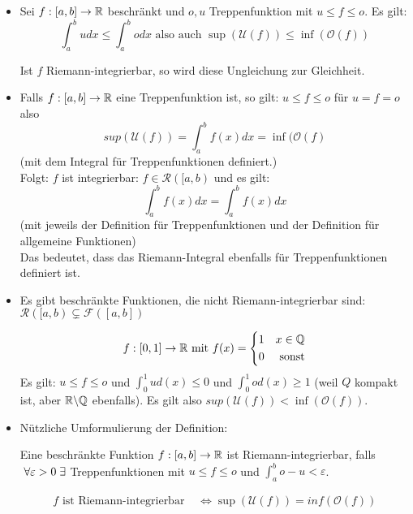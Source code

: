 \documentclass[main.tex]{subfiles}
\begin{document}
\begin{Bemerkung}
  \begin{itemize}
    \item Sei $f:[a,b] \to \R$ beschränkt und $o,u$ Treppenfunktion mit $u \leq f \leq o$. Es gilt:
      $$\int_a^b u dx \leq \int_a^b o dx \text{ also auch } \sup(\mathcal{U}(f)) \leq \inf(\mathcal{O}(f))$$
      \begin{Bemerkung}
        Ist $f$ Riemann-integrierbar, so wird diese Ungleichung zur Gleichheit.
      \end{Bemerkung}
    \item Falls $f:[a,b] \to \R$ eine Treppenfunktion ist, so gilt: $u \leq f \leq o$ für $u = f = o$ also
      $$sup(\mathcal{U}(f)) = \int_a^b f(x) dx = \inf(\mathcal{O}(f)$$
      (mit dem Integral für Treppenfunktionen definiert.)\\
      Folgt: $f$ ist integrierbar: $f\in \mathcal{R}([a,b)$ und es gilt:
      $$\int_a^b f(x)dx =\int_a^b f(x)dx$$
      (mit jeweils der Definition für Treppenfunktionen und der Definition für allgemeine Funktionen)\\
      Das bedeutet, dass das Riemann-Integral ebenfalls für Treppenfunktionen definiert ist.
    \item Es gibt beschränkte Funktionen, die nicht Riemann-integrierbar sind:
      $\mathcal{R}([a,b) \subsetneq \mathcal{F}([a,b])$
      \begin{Beispiel}
        $$f:[0,1] \to \R \text{ mit }f(x) = \left\{\begin{aligned}
          1 & & x \in \Q \\
          0 & & \text{sonst}
        \end{aligned}\right.$$
        Es gilt: $u \leq f \leq o$ und $\int_0^1 u d(x) \leq 0$ und $\int_0^1 o d(x) \geq 1$ (weil $Q$ kompakt ist, aber $\R \backslash \Q$ ebenfalls). Es gilt also $sup(\mathcal{U}(f)) < \inf(\mathcal{O}(f))$.
      \end{Beispiel}
    \item Nützliche Umformulierung der Definition:
      \begin{Definition}
        Eine beschränkte Funktion $f:[a,b] \to \R$ ist Riemann-integrierbar, falls $\A \varepsilon > 0 \E $ Treppenfunktionen mit $u \leq f \leq o$ und $\int_a^b o - u < \varepsilon$.
      \end{Definition}
      $$\begin{aligned}
        f \text{ ist Riemann-integrierbar } &\Leftrightarrow \sup(\mathcal{U}(f)) =inf(\mathcal{O}(f)) \\

\end{aligned}$$
\end{itemize}
\end{Bemerkung}
\end{document}
